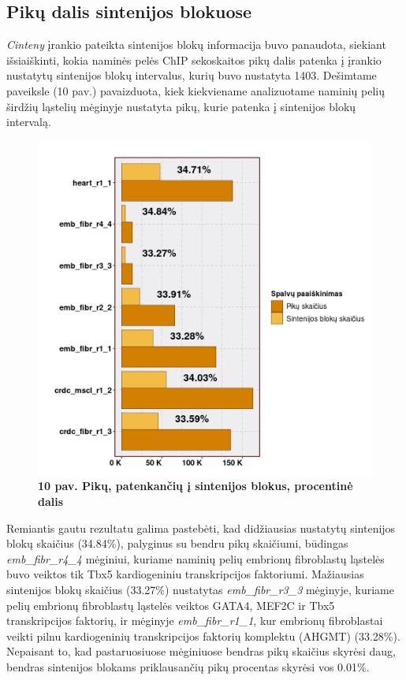 \documentclass[12pt]{article}
\begin{document}
\newpage

\subsection{Pikų dalis sintenijos blokuose}
\emph{Cinteny} įrankio pateikta sintenijos blokų informacija buvo panaudota,
siekiant išsiaiškinti, kokia naminės pelės ChIP sekoskaitos pikų dalis patenka į
įrankio nustatytų sintenijos blokų intervalus, kurių buvo nustatyta 1403.
Dešimtame paveiksle (10 pav.) pavaizduota, kiek kiekviename analizuotame
naminių pelių širdžių ląstelių mėginyje nustatyta pikų, kurie patenka į
sintenijos blokų intervalą.

\begin{figure}[htb]
    \begin{center}
        \includegraphics[width=0.65\linewidth]{../Figures/Synteny_blocks_peaks.png}
        \vspace{-2\baselineskip}
        \caption*{\small\textbf{10 pav. Pikų, patenkančių į sintenijos blokus,
                                procentinė dalis}}
        \label{fig:10}
    \end{center}
\end{figure}

Remiantis gautu rezultatu galima pastebėti, kad didžiausias nustatytų sintenijos
blokų skaičius (34.84\%), palyginus su bendru pikų skaičiumi, būdingas
\emph{emb\_fibr\_r4\_4} mėginiui, kuriame naminių pelių embrionų fibroblastų
ląstelės buvo veiktos tik Tbx5 kardiogeniniu transkripcijos faktoriumi.
Mažiausias sintenijos blokų skaičius (33.27\%) nustatytas
\emph{emb\_fibr\_r3\_3} mėginyje, kuriame pelių embrionų fibroblastų ląstelės
veiktos GATA4, MEF2C ir Tbx5 transkripcijos faktorių, ir mėginyje
\emph{emb\_fibr\_r1\_1}, kur embrionų fibroblastai veikti pilnu kardiogeninių
trans\-krip\-ci\-jos faktorių komplektu (AHGMT) (33.28\%). Nepaisant to, kad
pastaruosiuose mėginiuose bendras pikų skaičius skyrėsi daug, bendras sintenijos
blokams priklausančių pikų procentas skyrėsi vos 0.01\%.
\end{document}
